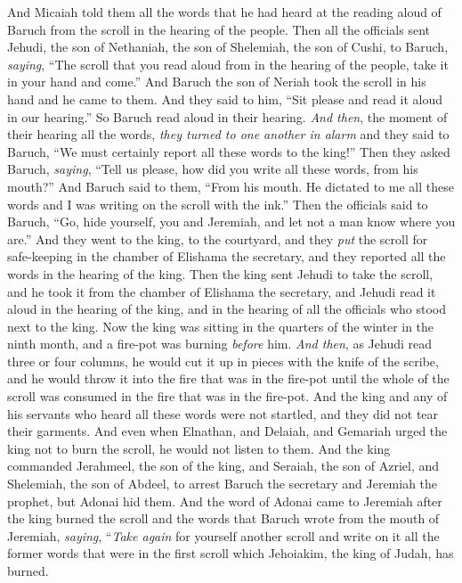 \begin{biblechapter}
\verse And Micaiah told them all the words that he had heard at the reading aloud of Baruch from the scroll in the hearing of the people.
\verse Then all the officials sent Jehudi, the son of Nethaniah, the son of Shelemiah, the son of Cushi, to Baruch, \textit{saying}, “The scroll that you read aloud from in the hearing of the people, take it in your hand and come.” And Baruch the son of Neriah took the scroll in his hand and he came to them.
\verse And they said to him, “Sit please and read it aloud in our hearing.” So Baruch read aloud in their hearing.
\verse \textit{And then}, the moment of their hearing all the words, \textit{they turned to one another in alarm} and they said to Baruch, “We must certainly report all these words to the king!”
\verse Then they asked Baruch, \textit{saying}, “Tell us please, how did you write all these words, from his mouth?”
\verse And Baruch said to them, “From his mouth. He dictated to me all these words and I was writing on the scroll with the ink.”
\verse Then the officials said to Baruch, “Go, hide yourself, you and Jeremiah, and let not a man know where you are.”
\verse And they went to the king, to the courtyard, and they \textit{put} the scroll for safe-keeping in the chamber of Elishama the secretary, and they reported all the words in the hearing of the king.
\verse Then the king sent Jehudi to take the scroll, and he took it from the chamber of Elishama the secretary, and Jehudi read it aloud in the hearing of the king, and in the hearing of all the officials who stood next to the king.
\verse Now the king was sitting in the quarters of the winter in the ninth month, and a fire-pot was burning \textit{before} him.
\verse \textit{And then}, as Jehudi read three or four columns, he would cut it up in pieces with the knife of the scribe, and he would throw it into the fire that was in the fire-pot until the whole of the scroll was consumed in the fire that was in the fire-pot.
\verse And the king and any of his servants who heard all these words were not startled, and they did not tear their garments.
\verse And even when Elnathan, and Delaiah, and Gemariah urged the king not to burn the scroll, he would not listen to them.
\verse And the king commanded Jerahmeel, the son of the king, and Seraiah, the son of Azriel, and Shelemiah, the son of Abdeel, to arrest Baruch the secretary and Jeremiah the prophet, but Adonai hid them.
\verse And the word of Adonai came to Jeremiah after the king burned the scroll and the words that Baruch wrote from the mouth of Jeremiah, \textit{saying},
\verse “\textit{Take again} for yourself another scroll and write on it all the former words that were in the first scroll which Jehoiakim, the king of Judah, has burned.

\end{biblechapter}
